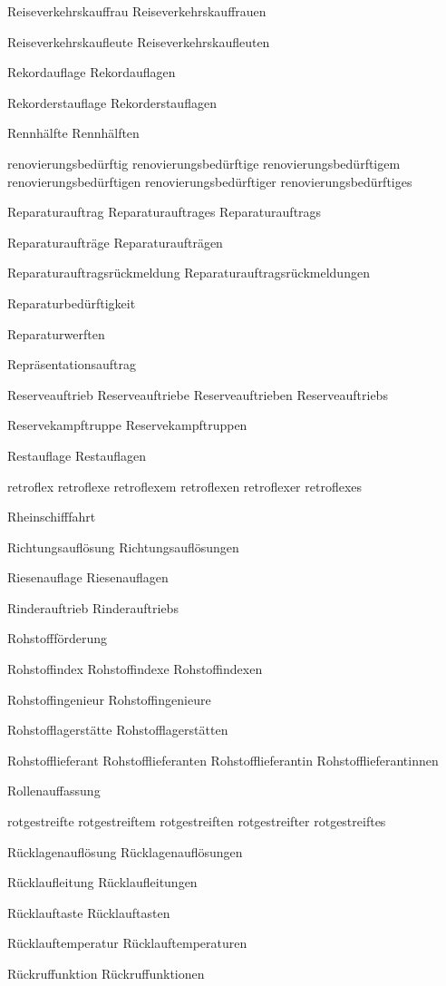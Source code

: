 Reiseverkehrskauffrau
Reiseverkehrskauffrauen

Reiseverkehrskaufleute
Reiseverkehrskaufleuten

Rekordauflage
Rekordauflagen

Rekorderstauflage
Rekorderstauflagen

Rennhälfte
Rennhälften

renovierungsbedürftig
renovierungsbedürftige
renovierungsbedürftigem
renovierungsbedürftigen
renovierungsbedürftiger
renovierungsbedürftiges

Reparaturauftrag
Reparaturauftrages
Reparaturauftrags

Reparaturaufträge
Reparaturaufträgen

Reparaturauftragsrückmeldung
Reparaturauftragsrückmeldungen

Reparaturbedürftigkeit

Reparaturwerften

Repräsentationsauftrag

Reserveauftrieb
Reserveauftriebe
Reserveauftrieben
Reserveauftriebs

Reservekampftruppe
Reservekampftruppen

Restauflage
Restauflagen

retroflex
retroflexe
retroflexem
retroflexen
retroflexer
retroflexes

Rheinschifffahrt

Richtungsauflösung
Richtungsauflösungen

Riesenauflage
Riesenauflagen

Rinderauftrieb
Rinderauftriebs

Rohstoffförderung

Rohstoffindex
Rohstoffindexe
Rohstoffindexen

Rohstoffingenieur
Rohstoffingenieure

Rohstofflagerstätte
Rohstofflagerstätten

Rohstofflieferant
Rohstofflieferanten
Rohstofflieferantin
Rohstofflieferantinnen

Rollenauffassung

rotgestreifte
rotgestreiftem
rotgestreiften
rotgestreifter
rotgestreiftes

Rücklagenauflösung
Rücklagenauflösungen

Rücklaufleitung
Rücklaufleitungen

Rücklauftaste
Rücklauftasten

Rücklauftemperatur
Rücklauftemperaturen

Rückruffunktion
Rückruffunktionen

